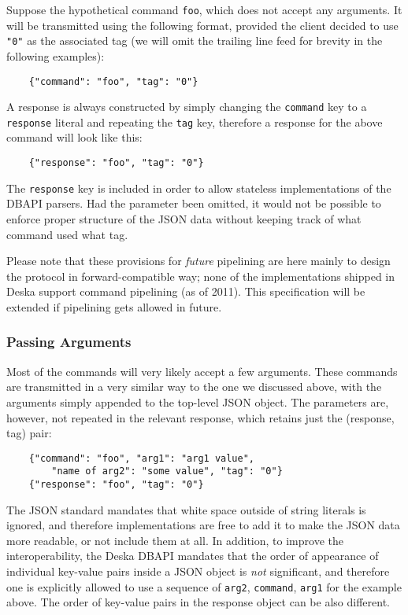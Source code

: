 \documentclass[deska]{subfiles}
\begin{document}
Suppose the hypothetical command {\tt foo}, which does not accept any arguments.  It will be transmitted using the
following format, provided the client decided to use {\tt "0"} as the associated tag (we will omit the trailing line
feed for brevity in the following examples):

\begin{verbatim}
    {"command": "foo", "tag": "0"}
\end{verbatim}

A response is always constructed by simply changing the {\tt command} key to a {\tt response} literal and repeating the
{\tt tag} key, therefore a response for the above command will look like this:

\begin{verbatim}
    {"response": "foo", "tag": "0"}
\end{verbatim}

The {\tt response} key is included in order to allow stateless implementations of the DBAPI parsers.  Had the parameter
been omitted, it would not be possible to enforce proper structure of the JSON data without keeping track of what
command used what tag.

Please note that these provisions for {\em future} pipelining are here mainly to design the protocol in
forward-compatible way; none of the implementations shipped in Deska support command pipelining (as of 2011).  This
specification will be extended if pipelining gets allowed in future.

\subsubsection{Passing Arguments}

Most of the commands will very likely accept a few arguments.  These commands are transmitted in a very similar way to
the one we discussed above, with the arguments simply appended to the top-level JSON object.  The parameters are,
however, not repeated in the relevant response, which retains just the (response, tag) pair:

\begin{verbatim}
    {"command": "foo", "arg1": "arg1 value",
        "name of arg2": "some value", "tag": "0"}
    {"response": "foo", "tag": "0"}
\end{verbatim}

The JSON standard mandates that white space outside of string literals is ignored, and therefore implementations are
free to add it to make the JSON data more readable, or not include them at all.  In addition, to improve the
interoperability, the Deska DBAPI mandates that the order of appearance of individual key-value pairs inside a JSON
object is {\em not} significant, and therefore one is explicitly allowed to use a sequence of {\tt arg2}, {\tt command},
{\tt arg1} for the example above.  The order of key-value pairs in the response object can be also different.
\end{document}

